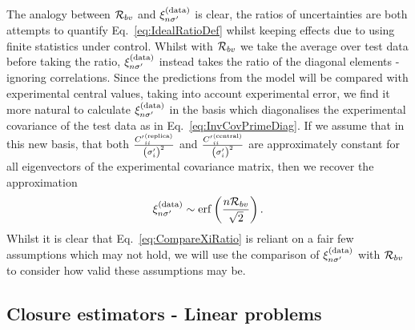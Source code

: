 The analogy between $\mathcal{R}_{bv}$ and $\xi^{(\rm data)}_{n {{\sigma}^{\prime}}}$ is clear, the ratios of
uncertainties are both attempts to quantify Eq.~\ref{eq:IdealRatioDef} whilst
keeping effects due to using finite statistics under control. Whilst with
$\mathcal{R}_{bv}$ we take the average over test data before taking the ratio,
$\xi^{(\rm data)}_{n {{\sigma}^{\prime}}}$ instead takes the ratio of the diagonal elements - ignoring
correlations. Since the predictions from the model will be compared with
experimental central values, taking into account experimental error, we find it
more natural to calculate $\xi^{(\rm data)}_{n {{\sigma}^{\prime}}}$ in the basis which diagonalises the
experimental covariance of the test data as in Eq.~\ref{eq:InvCovPrimeDiag}. If
we assume that in this new basis, that both
$\frac{{{C}^{\prime}}^{(\rm replica)}_{ii}}{\left(\sigma'_i\right)^2}$ and
$\frac{{{C}^{\prime}}^{(\rm central)}_{ii}}{\left(\sigma'_i\right)^2}$ are approximately constant for
all eigenvectors of the experimental covariance matrix, then we recover the
approximation
\begin{equation}\label{eq:CompareXiRatio}
    \xi^{(\rm data)}_{n {{\sigma}^{\prime}}} \sim {\rm erf} \left( \frac{ n\mathcal{R}_{bv}}{\sqrt{2}} \right).
\end{equation}
Whilst it is clear that Eq.~\ref{eq:CompareXiRatio} is reliant on a fair few
assumptions which may not hold, we will use the comparison of $\xi^{(\rm data)}_{n {{\sigma}^{\prime}}}$ with
$\mathcal{R}_{bv}$ to consider how valid these assumptions may be.

\subsection{Closure estimators - Linear problems}
\label{Sec:LinearMapEstimators}

